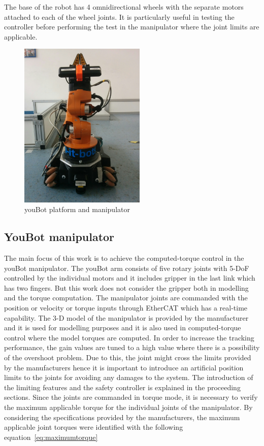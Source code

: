 The base of the robot has 4 omnidirectional wheels with the separate motors attached to each of the wheel joints. It is particularly useful in testing the controller before performing the test in the manipulator where the joint limits are applicable. 

\begin{figure}[h]
\centering
\includegraphics[width=60mm, trim=0 50 0 20]{pictures/youbot.jpg}
\caption[base]{youBot platform and manipulator}
\end{figure}

\subsection*{YouBot manipulator}

The main focus of this work is to achieve the computed-torque control in the youBot manipulator. The youBot arm consists of five rotary joints with 5-DoF controlled by the individual motors and it includes gripper in the last link which has two fingers. But this work does not consider the gripper both in modelling and the torque computation. The manipulator joints are commanded with the position or velocity or torque inputs through EtherCAT which has a real-time capability. The 3-D model of the manipulator is provided by the manufacturer~\cite{kukamanipulator} and it is used for modelling purposes and it is also used in computed-torque control where the model torques are computed. In order to increase the tracking performance, the gain values are tuned to a high value where there is a possibility of the overshoot problem. Due to this, the joint might cross the limits provided by the manufacturers hence it is important to introduce an artificial position limits to the joints for avoiding any damages to the system. The introduction of the limiting features and the safety controller is explained in the proceeding sections. Since the joints are commanded in torque mode, it is necessary to verify the maximum applicable torque for the individual joints of the manipulator. By considering the specifications provided by the manufacturers, the maximum applicable joint torques were identified with the following equation~\eqref{eq:maximumtorque}

